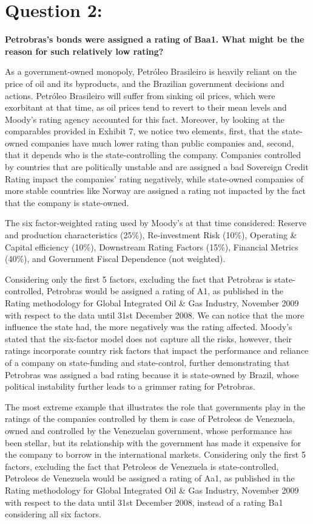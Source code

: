 \documentclass[
]{article}
\begin{document}
\hypertarget{question-2}{%
\section{Question 2:}\label{question-2}}

\textbf{Petrobras's bonds were assigned a rating of Baa1. What might be
the reason for such relatively low rating?}

As a government-owned monopoly, Petróleo Brasileiro is heavily reliant
on the price of oil and its byproducts, and the Brazilian government
decisions and actions. Petróleo Brasileiro will suffer from sinking oil
prices, which were exorbitant at that time, as oil prices tend to revert
to their mean levels and Moody's rating agency accounted for this fact.
Moreover, by looking at the comparables provided in Exhibit 7, we notice
two elements, first, that the state-owned companies have much lower
rating than public companies and, second, that it depends who is the
state-controlling the company. Companies controlled by countries that
are politically unstable and are assigned a bad Sovereign Credit Rating
impact the companies' rating negatively, while state-owned companies of
more stable countries like Norway are assigned a rating not impacted by
the fact that the company is state-owned.

The six factor-weighted rating used by Moody's at that time considered:
Reserve and production characteristics (25\%), Re-investment Risk
(10\%), Operating \& Capital efficiency (10\%), Downstream Rating
Factors (15\%), Financial Metrics (40\%), and Government Fiscal
Dependence (not weighted).

Considering only the first 5 factors, excluding the fact that Petrobras
is state-controlled, Petrobras would be assigned a rating of A1, as
published in the Rating methodology for Global Integrated Oil \& Gas
Industry, November 2009 with respect to the data until 31st December
2008. We can notice that the more influence the state had, the more
negatively was the rating affected. Moody's stated that the six-factor
model does not capture all the risks, however, their ratings incorporate
country risk factors that impact the performance and reliance of a
company on state-funding and state-control, further demonstrating that
Petrobras was assigned a bad rating because it is state-owned by Brazil,
whose political instability further leads to a grimmer rating for
Petrobras.

The most extreme example that illustrates the role that governments play
in the ratings of the companies controlled by them is case of Petroleos
de Venezuela, owned and controlled by the Venezuelan government, whose
performance has been stellar, but its relationship with the government
has made it expensive for the company to borrow in the international
markets. Considering only the first 5 factors, excluding the fact that
Petroleos de Venezuela is state-controlled, Petroleos de Venezuela would
be assigned a rating of Aa1, as published in the Rating methodology for
Global Integrated Oil \& Gas Industry, November 2009 with respect to the
data until 31st December 2008, instead of a rating Ba1 considering all
six factors.
\end{document}
